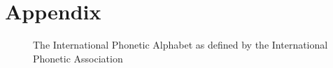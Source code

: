 \documentclass[titlepage]{article}
\begin{document}
\appendix
\section{Appendix}

\renewcommand\thefigure{\thesection.\arabic{figure}}    
\setcounter{figure}{0}

  \begin{figure}
    \caption{The International Phonetic Alphabet as defined by the International
    Phonetic Association}
    \label{ipaChart}
  \end{figure}

\newpage
\printbibliography
\end{document}
